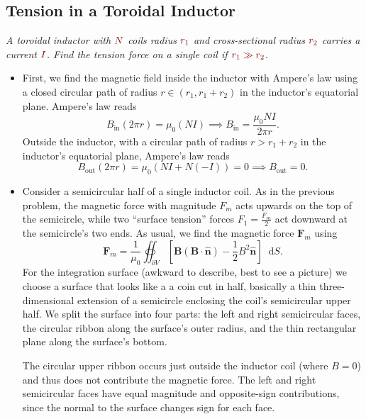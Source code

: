\documentclass[11pt, a4paper]{article}
\newcommand{\diff}{\mathop{}\!\mathrm{d}} %
\newcommand{\dmath}[1]{\textcolor{Maroon}{#1}}  %
\renewcommand{\vec}[1]{\bm{#1}} %
\newcommand{\uvec}[1]{\hat{\vec{#1}}} %
\newcommand{\B}{\vec{B}}  %
\begin{document}
\subsection{Tension in a Toroidal Inductor}
\textit{A toroidal inductor with $ \dmath{N} $ coils radius $ \dmath{r_{1}} $ and cross-sectional radius $ \dmath{r_{2}} $ carries a current $ \dmath{I} $. Find the tension force on a single coil if $ \dmath{r_{1} \gg r_{2}} $.}
\begin{itemize}
	\item First, we find the magnetic field inside the inductor with Ampere's law using a closed circular path of radius $ r \in (r_{1}, r_{1} + r_{2}) $ in the inductor's equatorial plane. Ampere's law reads
	\begin{equation*}
		B_{\text{in}} (2\pi r) = \mu_{0} (NI) \implies B_{\text{in}} = \frac{\mu_{0}NI}{2\pi r}.
	\end{equation*}
	Outside the inductor, with a circular path of radius $ r > r_{1} + r_{2} $ in the inductor's equatorial plane, Ampere's law reads
	\begin{equation*}
		B_{\text{out}} (2\pi r) = \mu_{0} (NI + N(-I)) = 0 \implies B_{\text{out}} = 0.
	\end{equation*}
	
	\item Consider a semicircular half of a single inductor coil. As in the previous problem, the magnetic force with magnitude $ F_{m} $ acts upwards on the top of the semicircle, while two ``surface tension'' forces $ F_{1} = \frac{F_{m}}{2} $ act downward at the semicircle's two ends. As usual, we find the magnetic force $ \vec{F}_{m} $ using
	\begin{equation*}
		\vec{F}_{m} = \frac{1}{\mu_{0}}\oiint_{\partial V}\left [\B(\B \cdot \uvec{n}) - \frac{1}{2}B^{2}\uvec{n}\right ] \diff S.
	\end{equation*}
	For the integration surface (awkward to describe, best to see a picture) we choose a surface that looks like a a coin cut in half, basically a thin three-dimensional extension of a semicircle enclosing the coil's semicircular upper half. We split the surface into four parts: the left and right semicircular faces, the circular ribbon along the surface's outer radius, and the thin rectangular plane along the surface's bottom. 
	
	The circular upper ribbon occurs just outside the inductor coil (where $ B = 0 $) and thus does not contribute the magnetic force. The left and right semicircular faces have equal magnitude and opposite-sign contributions, since the normal to the surface changes sign for each face. 
	

\end{itemize}
\end{document}
